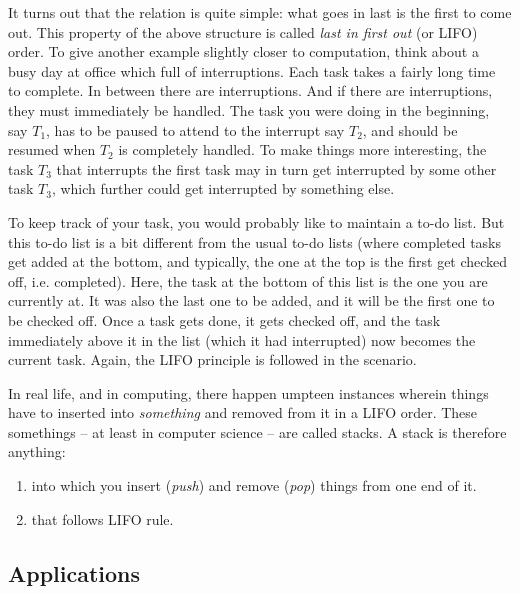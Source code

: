 \documentclass[12pt,a4paper]{article}
\begin{document}
It turns out that the relation is quite simple: what goes in last is the first to come out. This property of the above structure is called \emph{last in first out} (or LIFO) order. To give another example slightly closer to computation, think about a busy day at office which full of interruptions. Each task takes a fairly long time to complete. In between there are interruptions. And if there are interruptions, they must immediately be handled. The task you were doing in the beginning, say $T_1$, has to be paused to attend to the interrupt say $T_2$, and should be resumed when $T_2$ is completely handled. To make things more interesting, the task $T_3$ that interrupts the first task may in turn get interrupted by some other task $T_3$, which further could get interrupted by something else.

To keep track of your task, you would probably like to maintain a to-do list. But this to-do list is a bit different from the usual to-do lists (where completed tasks get added at the bottom, and typically, the one at the top is the first get checked off, i.e. completed). Here, the task at the bottom of this list is the one you are currently at. It was also the last one to be added, and it will be the first one to be checked off. Once a task gets done, it gets checked off, and the task immediately above it in the list (which it had interrupted) now becomes the current task. Again, the LIFO principle is followed in the scenario.

In real life, and in computing, there happen umpteen instances wherein things have to inserted into \emph{something} and removed from it in a LIFO order. These somethings -- at least in computer science -- are called stacks. A stack is therefore anything:
\begin{enumerate}
\item into which you insert (\emph{push}) and remove (\emph{pop}) things from one end of it.
\item that follows LIFO rule.
\end{enumerate}

\subsection{Applications}
\end{document}
